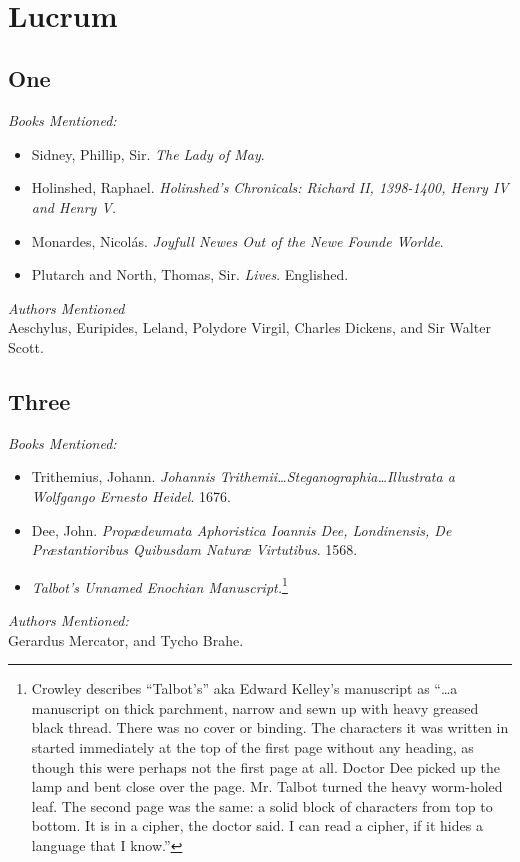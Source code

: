 \documentclass[12pt,makeidx]{extreport}
\newcommand\fleuron{\begin{turn}{45}\Large \ding{166}\end{turn}}
\newcommand\doublefleuron{%
	\reflectbox{\fleuron}\AC\staveXLIX\reflectbox{\AC}\fleuron}
\newcommand\fleuronbar{%
	{\huge\LinearACCCXIII}\xrfill[1.3ex]{1pt}\doublefleuron\xrfill[1.3ex]{1pt}\reflectbox{\huge\LinearACCCXIII}}
\newcommand\nbvspace[1][3]{\vspace*{\stretch{#1}}}
\begin{document}
\begin{center}
\vfill
\shadowoffset{1pt}
\\
\nbvspace[1]
\end{center}

\chapter{Lucrum}
\section{One}
\textit{Books Mentioned:}
\begin{itemize}
\item Sidney, Phillip, Sir. \textit{The Lady of May}. \cite{Sidney1598}
\item Holinshed, Raphael. \textit{Holinshed's Chronicals: Richard II, 1398-1400, Henry IV and Henry V.}  \cite{Holinshed1923}
\item Monardes, Nicolás. \textit{Joyfull Newes Out of the Newe Founde Worlde}. \cite{Monardes1970}
\item Plutarch and North, Thomas, Sir. \textit{Lives}. Englished. \cite{Plutarch1894}
\end{itemize}
\textit{Authors Mentioned}\\
Aeschylus, Euripides, Leland, Polydore Virgil, Charles Dickens, and Sir Walter Scott.

\section{Three}
\textit{Books Mentioned:}
\begin{itemize}
\item Trithemius, Johann. \textit{Johannis Trithemii\ldots Steganographia\ldots Illustrata a Wolfgango Ernesto Heidel}. 1676. \cite{Trithemius}
\item Dee, John. \textit{Propædeumata Aphoristica Ioannis Dee, Londinensis, De Præstantioribus Quibusdam Naturæ Virtutibus}. 1568. \cite{Dee1568}
\item \textit{Talbot's Unnamed Enochian Manuscript.}\footnote{Crowley describes “Talbot's” aka Edward Kelley's manuscript as “\ldots a manuscript on thick parchment, narrow and sewn up with heavy greased black thread. There was no cover or binding. The characters it was written in started immediately at the top of the first page without any heading, as though this were perhaps not the first page at all. Doctor Dee picked up the lamp and bent close over the page. Mr. Talbot turned the heavy worm-holed leaf. The second page was the same: a solid block of characters from top to bottom. It is in a cipher, the doctor said. I can read a cipher, if it hides a language that I know.”}
\end{itemize}
\textit{Authors Mentioned:}\\
Gerardus Mercator, and Tycho Brahe.
\end{document}
